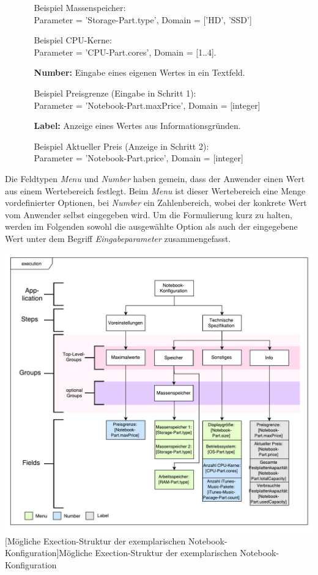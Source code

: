 \documentclass[11pt, a4paper, titlepage, listof=totoc, bibliography=totoc, index=totoc, twoside, openright, headings=normal, draft]{scrreprt}
\begin{document}
\begin{enumerate}[1.]
\begin{enumerate}[(a)]
Beispiel Massenspeicher:\\
Parameter = 'Storage-Part.type',  Domain = ['HD', 'SSD']

Beispiel CPU-Kerne:\\
Parameter = 'CPU-Part.cores', Domain = [1..4].
\item [\textbf{Number:}] Eingabe eines eigenen Wertes in ein Textfeld.

Beispiel Preisgrenze (Eingabe in Schritt 1):\\
 Parameter = 'Notebook-Part.maxPrice', Domain = [integer]
\item [\textbf{Label:}] Anzeige eines Wertes aus Informationsgründen.

Beispiel Aktueller Preis (Anzeige in Schritt 2):\\
Parameter = 'Notebook-Part.price', Domain = [integer]
\end{enumerate}
\end{enumerate}

Die Feldtypen \emph{Menu} und \emph{Number} haben gemein, dass der Anwender einen Wert aus einem Wertebereich festlegt. Beim \emph{Menu} ist dieser Wertebereich eine Menge vordefinierter Optionen, bei \emph{Number} ein Zahlenbereich, wobei der konkrete Wert vom Anwender selbst eingegeben wird. Um die Formulierung kurz zu halten, werden im Folgenden sowohl die ausgewählte Option als auch der eingegebene Wert unter dem Begriff \emph{Eingabeparameter} zusammengefasst.

\begin{minipage}{\linewidth}
	\centering
	\includegraphics[width=0.8\linewidth]{Abbildungen/tactonModellExecutionNotebook.pdf}
	[Mögliche Exection-Struktur der exemplarischen Notebook-Konfiguration]{Mögliche Exection-Struktur der exemplarischen Notebook-Konfiguration}
	\label{fig:tactonModellExecutionNotebook}
\end{minipage}
\vspace{0.3em}
\end{document}
